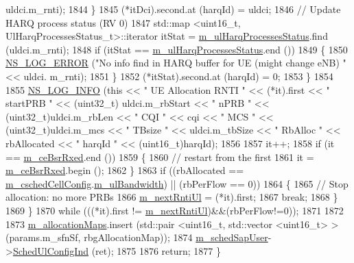 \begin{DoxyCode}
      uldci.m\_rnti);
1844             \}
1845           (*itDci).second.at (harqId) = uldci;
1846           \textcolor{comment}{// Update HARQ process status (RV 0)}
1847           std::map <uint16\_t, UlHarqProcessesStatus\_t>::iterator itStat = 
      \hyperlink{classns3_1_1TdTbfqFfMacScheduler_a845d3e79ce5c38b47c8ac8a7e4cc5b37}{m\_ulHarqProcessesStatus}.find (uldci.m\_rnti);
1848           \textcolor{keywordflow}{if} (itStat == \hyperlink{classns3_1_1TdTbfqFfMacScheduler_a845d3e79ce5c38b47c8ac8a7e4cc5b37}{m\_ulHarqProcessesStatus}.end ())
1849             \{
1850               \hyperlink{group__logging_ga0261a8db1d4ac5f79417d117634fd455}{NS\_LOG\_ERROR} (\textcolor{stringliteral}{"No info find in HARQ buffer for UE (might change eNB) "} << uldci.
      m\_rnti);
1851             \}
1852           (*itStat).second.at (harqId) = 0;
1853         \}
1854 
1855       \hyperlink{group__logging_gafbd73ee2cf9f26b319f49086d8e860fb}{NS\_LOG\_INFO} (\textcolor{keyword}{this} << \textcolor{stringliteral}{" UE Allocation RNTI "} << (*it).first << \textcolor{stringliteral}{" startPRB "} << (uint32\_t)
      uldci.m\_rbStart << \textcolor{stringliteral}{" nPRB "} << (uint32\_t)uldci.m\_rbLen << \textcolor{stringliteral}{" CQI "} << cqi << \textcolor{stringliteral}{" MCS "} << (uint32\_t)uldci.m\_mcs 
      << \textcolor{stringliteral}{" TBsize "} << uldci.m\_tbSize << \textcolor{stringliteral}{" RbAlloc "} << rbAllocated << \textcolor{stringliteral}{" harqId "} << (uint16\_t)harqId);
1856 
1857       it++;
1858       \textcolor{keywordflow}{if} (it == \hyperlink{classns3_1_1TdTbfqFfMacScheduler_ab399ba0c15f9cd1688fb044cf915deb7}{m\_ceBsrRxed}.end ())
1859         \{
1860           \textcolor{comment}{// restart from the first}
1861           it = \hyperlink{classns3_1_1TdTbfqFfMacScheduler_ab399ba0c15f9cd1688fb044cf915deb7}{m\_ceBsrRxed}.begin ();
1862         \}
1863       \textcolor{keywordflow}{if} ((rbAllocated == \hyperlink{classns3_1_1TdTbfqFfMacScheduler_a3ac3e4b1b3818ff204d6ff6c89c19f4d}{m\_cschedCellConfig}.\hyperlink{structns3_1_1FfMacCschedSapProvider_1_1CschedCellConfigReqParameters_a5ab5b102878e6e7e7727a14af4a64d2f}{m\_ulBandwidth}) || (rbPerFlow ==
       0))
1864         \{
1865           \textcolor{comment}{// Stop allocation: no more PRBs}
1866           \hyperlink{classns3_1_1TdTbfqFfMacScheduler_a01649b4140890dd7adb19d752be0a6ff}{m\_nextRntiUl} = (*it).first;
1867           \textcolor{keywordflow}{break};
1868         \}
1869     \}
1870   \textcolor{keywordflow}{while} (((*it).first != \hyperlink{classns3_1_1TdTbfqFfMacScheduler_a01649b4140890dd7adb19d752be0a6ff}{m\_nextRntiUl})&&(rbPerFlow!=0));
1871 
1872 
1873   \hyperlink{classns3_1_1TdTbfqFfMacScheduler_a0801127489d3eda5a462660c4af4c8bd}{m\_allocationMaps}.insert (std::pair <uint16\_t, std::vector <uint16\_t> > (params.m\_sfnSf, 
      rbgAllocationMap));
1874   \hyperlink{classns3_1_1TdTbfqFfMacScheduler_a8f5689c5d8af1b40e97dacfce14f605a}{m\_schedSapUser}->\hyperlink{classns3_1_1FfMacSchedSapUser_a1b89636256701a84d990db7db8aea874}{SchedUlConfigInd} (ret);
1875 
1876   \textcolor{keywordflow}{return};
1877 \}
\end{DoxyCode}


